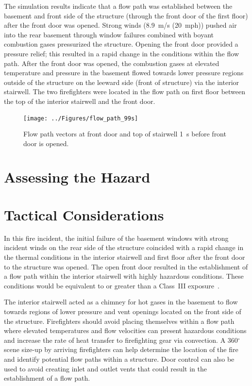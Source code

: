 \documentclass[12pt,oneside]{book}
\begin{document}
The simulation results indicate that a flow path was established between the basement and front side of the structure (through the front door of the first floor) after the front door was opened. Strong winds (8.9~m/s (20~mph)) pushed air into the rear basement through window failures combined with boyant combustion gases pressurized the structure. Opening the front door provided a pressure relief; this resulted in a rapid change in the conditions within the flow path. After the front door was opened, the combustion gases at elevated temperature and pressure in the basement  flowed towards lower pressure regions outside of the structure on the leeward side (front of structure) via the interior stairwell. The two firefighters were located in the flow path on first floor between the top of the interior stairwell and the front door.



\begin{figure}[!ht]
\texttt{[image: ../Figures/flow\_path\_99s]}


\caption[Flow path vectors at front door and top of stairwell 1~s before front door is opened]
{Flow path vectors at front door and top of stairwell 1~s before front door is opened.}
\label{fig:flow_path_99s}
\end{figure}



\section{Assessing the Hazard}
\label{assessing_hazard}

\clearpage

\section{Tactical Considerations}
\label{tactical_considerations}

In this fire incident, the initial failure of the basement windows with strong incident winds on the rear side of the structure coincided with a rapid change in the thermal conditions in the interior stairwell and first floor after the front door to the structure was opened. The open front door resulted in the establishment of a flow path within the interior stairwell with highly hazardous conditions. These conditions would be equivalent to or greater than a Class~III exposure~\cite{Donnelly2006}.

The interior stairwell acted as a chimney for hot gases in the basement to flow towards regions of lower pressure and vent openings located on the front side of the structure. Firefighters should avoid placing themselves within a flow path where elevated temperatures and flow velocities can present hazardous conditions and increase the rate of heat transfer to firefighting gear via convection. A 360$^\circ$ scene size-up by arriving firefighters can help determine the location of the fire and identify potential flow paths within a structure. Door control can also be used to avoid creating inlet and outlet vents that could result in the establishment of a flow path.
\end{document}
